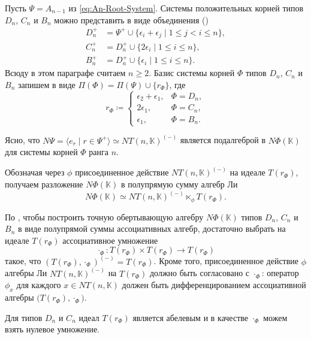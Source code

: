 \documentclass[a4paper,14pt,oneside,openany]{memoir}
\begin{document}
Пусть $\Psi = A_{n-1}$ из \eqref{eq:An-Root-System}. Системы положительных
корней типов $D_n$, $C_n$ и $B_n$ можно представить в виде объединения
(\cite[таблицы I--IV]{bourbaki72})
\[
    \begin{aligned}
        D_n^+ & = \Psi^+ \cup \{\epsilon_i+\epsilon_j \mid 1\le j<i\le n\}, \\
        C_n^+ & = D_n^+ \cup \{2\epsilon_i \mid 1\le i\le n\},              \\
        B_n^+ & = D_n^+ \cup \{\epsilon_i \mid 1\le i\le n\}.
    \end{aligned}
\]
%
Всюду в этом параграфе считаем $n \geq 2$. Базис системы корней $\Phi$ типов
$D_n$, $C_n$ и $B_n$ запишем в виде $\Pi(\Phi) = \Pi(\Psi) \cup \{r_\Phi\}$,
где
\[
    r_\Phi\coloneq
    \begin{cases}
        \epsilon_2 + \epsilon_1, & \Phi = D_n, \\
        2\epsilon_1,             & \Phi = C_n, \\
        \epsilon_1,              & \Phi = B_n.
    \end{cases}
\]

Ясно, что $N\Psi = \langle e_r\mid r \in \Psi^+ \rangle \simeq
NT(n,\mathbb{K})^{(-)}$ является подалгеброй в $N\Phi(\mathbb{K})$ для системы
корней $\Phi$ ранга $n$.

\medskip

Обозначая через $\phi$ присоединенное действие $NT(n,\mathbb{K})^{(-)}$ на
идеале $T(r_\Phi)$, получаем разложение $N\Phi(\mathbb{K})$ в полупрямую сумму
алгебр Ли
\begin{equation*}
    N\Phi(\mathbb{K})\simeq NT(n,\mathbb{K})^{(-)} \ltimes_\phi T(r_\Phi).
\end{equation*}

По  ,
чтобы построить точную обертывающую алгебру $N\Phi(\mathbb{K})$ типов $D_n$,
$C_n$ и $B_n$ в виде полупрямой суммы ассоциативных алгебр, достаточно выбрать
на идеале $T(r_\Phi)$ ассоциативное умножение
\[
    \cdot_\Phi\colon T(r_\Phi) \times T(r_\Phi) \to T(r_\Phi)
\]
такое, что $(T(r_\Phi), \cdot_\Phi)^{(-)} = T(r_\Phi)$. Кроме того,
присоединенное действие $\phi$ алгебры Ли $NT(n,\mathbb{K})^{(-)}$ на
$T(r_\Phi)$ должно быть согласовано с $\cdot_\Phi$: оператор $\phi_x$ для
каждого $x\in NT(n,\mathbb{K})$ должен быть дифференцированием ассоциативной
алгебры $\bigl(T(r_\Phi),\cdot_\Phi\bigr)$.

\medskip

Для типов $D_n$ и $C_n$ идеал $T(r_\Phi)$ является абелевым и в качестве
$\cdot_\Phi$ можем взять нулевое умножение.
\end{document}
